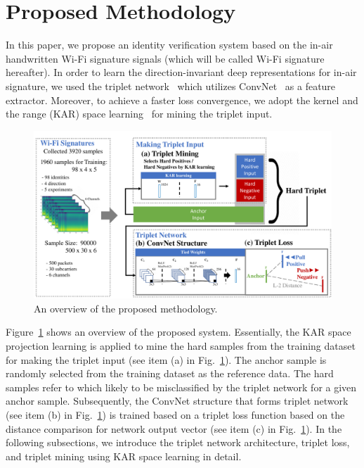 \section{Proposed Methodology}
\label{sec:methodology}
In this paper, we propose an identity verification system based on the in-air handwritten Wi-Fi signature signals (which will be called Wi-Fi signature hereafter). 
In order to learn the direction-invariant deep representations for in-air signature, we used the triplet network~\cite{hoffer2015deep} which utilizes ConvNet~\cite{lecun1998gradient} as a feature extractor. Moreover, to achieve a faster loss convergence, we adopt the kernel and the range (KAR) space learning~\cite{toh2018learning,toh2018gradient} for mining the triplet input. 
\begin{figure}[!ht]
    \includegraphics[width=\textwidth]
        {fig_system_overview_v1.pdf}
    \caption{An overview of the proposed methodology.} \label{fig1}
\end{figure}
Figure~\ref{fig1} shows an overview of the proposed system. 
Essentially, the KAR space projection learning is applied to mine the hard samples from the training dataset for making the triplet input (see item (a) in Fig.~\ref{fig1}). The anchor sample is randomly selected from the training dataset as the reference data. The hard samples refer to which likely to be misclassified by the triplet network for a given anchor sample.
Subsequently, the ConvNet structure that forms triplet network (see item (b) in Fig.~\ref{fig1}) is trained based on a triplet loss function based on the distance comparison for network output vector (see item (c) in Fig.~\ref{fig1}).
In the following subsections, we introduce the triplet network architecture, triplet loss, and triplet mining using KAR space learning in detail.

